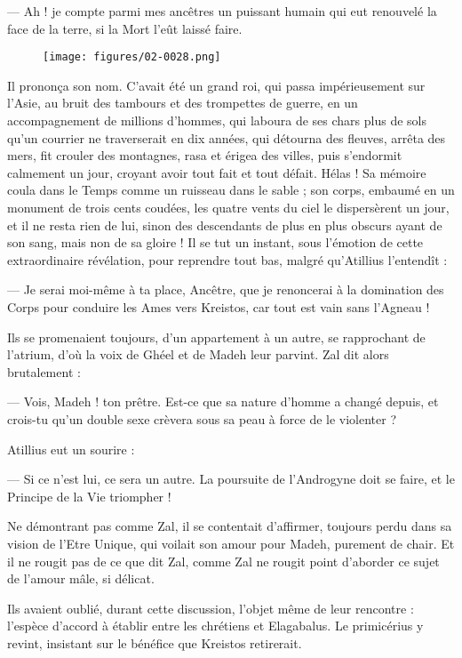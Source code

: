 \documentclass[a4paper, 11pt, oneside, polutonikogreek, french]{article}
\begin{document}
--- Ah ! je compte parmi mes ancêtres un puissant humain qui eut renouvelé la face de la terre, si la Mort l'eût laissé faire.
\begin{figure}[H]
\centering
\texttt{[image: figures/02-0028.png]}
\end{figure}
Il prononça son nom. C'avait été un grand roi, qui passa impérieusement sur l'Asie, au bruit des tambours et des trompettes de guerre, en un accompagnement de millions d’hommes, qui laboura de ses chars plus de sols qu'un courrier ne traverserait en dix années, qui détourna des fleuves, arrêta des mers, fit crouler des montagnes, rasa et érigea des villes, puis s'endormit calmement un jour, croyant avoir tout fait et tout défait. Hélas ! Sa mémoire coula dans le Temps comme un ruisseau dans le sable ; son corps, embaumé en un monument de trois cents coudées, les quatre vents du ciel le dispersèrent un jour, et il ne resta rien de lui, sinon des descendants de plus en plus obscurs ayant de son sang, mais non de sa gloire ! Il se tut un instant, sous l'émotion de cette extraordinaire révélation, pour reprendre tout bas, malgré qu'Atillius l'entendît :

--- Je serai moi-même à ta place, Ancêtre, que je renoncerai à la domination des Corps pour conduire les Ames vers Kreistos, car tout est vain sans l'Agneau !

Ils se promenaient toujours, d'un appartement à un autre, se rapprochant de l'atrium, d'où la voix de Ghéel et de Madeh leur parvint. Zal dit alors brutalement :

--- Vois, Madeh ! ton prêtre. Est-ce que sa nature d'homme a changé depuis, et crois-tu qu'un double sexe crèvera sous sa peau à force de le violenter ?

Atillius eut un sourire :

--- Si ce n'est lui, ce sera un autre. La poursuite de l'Androgyne doit se faire, et le Principe de la Vie triompher !

Ne démontrant pas comme Zal, il se contentait d'affirmer, toujours perdu dans sa vision de l'Etre Unique, qui voilait son amour pour Madeh, purement de chair. Et il ne rougit pas de ce que dit Zal, comme Zal ne rougit point d'aborder ce sujet de l'amour mâle, si délicat.

Ils avaient oublié, durant cette discussion, l'objet même de leur rencontre : l'espèce d'accord à établir entre les chrétiens et Elagabalus. Le primicérius y revint, insistant sur le bénéfice que Kreistos retirerait.
\end{document}

